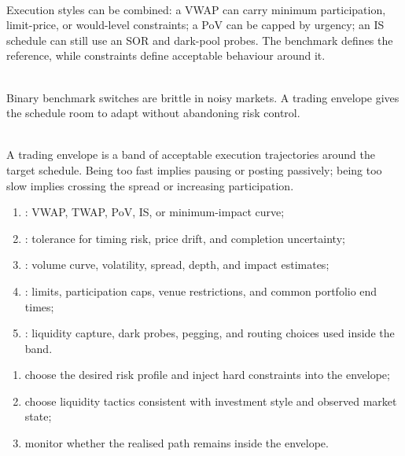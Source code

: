 \documentclass[a4paper,oneside,openany]{book}
\begin{document}
\begin{principle} \\
Execution styles can be combined: a VWAP can carry minimum participation, limit-price, or would-level constraints; a PoV can be capped by urgency; an IS schedule can still use an SOR and dark-pool probes. The benchmark defines the reference, while constraints define acceptable behaviour around it.
\end{principle}

\begin{caveat} \\
Binary benchmark switches are brittle in noisy markets. A trading envelope gives the schedule room to adapt without abandoning risk control.
\end{caveat}

\begin{definition} \\
A trading envelope is a band of acceptable execution trajectories around the target schedule. Being too fast implies pausing or posting passively; being too slow implies crossing the spread or increasing participation.
\end{definition}

\begin{taxonomy} 
\begin{enumerate}[label=\roman*.]
\setlength{\itemsep}{0pt}
\item {}: VWAP, TWAP, PoV, IS, or minimum-impact curve;
\item {}: tolerance for timing risk, price drift, and completion uncertainty;
\item {}: volume curve, volatility, spread, depth, and impact estimates;
\item {}: limits, participation caps, venue restrictions, and common portfolio end times;
\item {}: liquidity capture, dark probes, pegging, and routing choices used inside the band.
\end{enumerate}
\end{taxonomy}

\begin{process} 
\begin{enumerate}[label=\roman*.]
\setlength{\itemsep}{0pt}
\item choose the desired risk profile and inject hard constraints into the envelope;
\item choose liquidity tactics consistent with investment style and observed market state;
\item monitor whether the realised path remains inside the envelope.
\end{enumerate}
\end{process}
\end{document}
